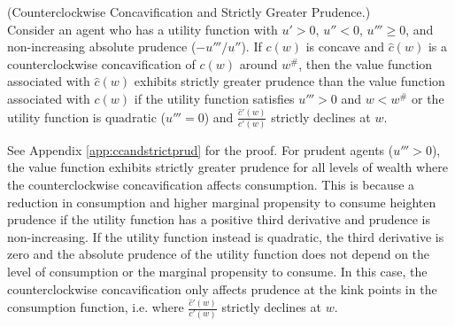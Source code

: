 \begin{corollary} \label{cor:ccandstrictprud}(Counterclockwise Concavification and Strictly Greater Prudence.)\\
	Consider an agent who has a utility function with $u' > 0$, $u'' < 0$, $u''' \geq 0$, and non-increasing absolute prudence ($-u'''/u''$). If $c(w)$ is concave and $\hat{c}(w)$ is a counterclockwise concavification of $c(w)$ around $w^{\#}$, then the value function associated with $\hat{c}(w)$ exhibits strictly greater prudence than the value function associated with $c(w)$ if the utility function satisfies $u''' > 0$ and $w < w^{\#}$ or the utility function is quadratic ($u''' = 0$) and $\frac{\hat{c}'(w)}{c'(w)}$ strictly declines at $w$.
\end{corollary}
\noindent See Appendix \ref{app:ccandstrictprud} for the proof. For prudent agents ($u''' > 0$), the value function exhibits strictly greater prudence for all levels of wealth where the counterclockwise concavification affects consumption. This is because a reduction in consumption and higher marginal propensity to consume heighten prudence if the utility function has a positive third derivative and prudence is non-increasing. If the utility function instead is quadratic, the third derivative is zero and the absolute prudence of the utility function does not depend on the level of consumption or the marginal propensity to consume. In this case, the counterclockwise concavification only affects prudence at the kink points in the consumption function, i.e. where $\frac{\hat{c}'(w)}{c'(w)}$ strictly declines at $w$.
